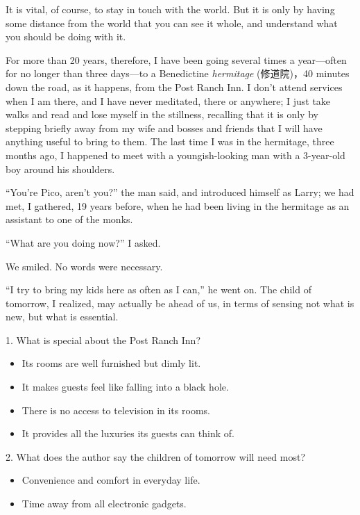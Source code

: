 \documentclass[UTF8,11pt]{ctexart}
\begin{document}
It is vital, of course, to stay in touch with the world. But it is only by having some distance from the world that you can see it whole, and understand what you should be doing with it.


For more than 20 years, therefore, I have been going several times a year—often for no longer than three days—to a Benedictine\textit{ hermitage} (修道院)，40 minutes down the road, as it happens, from the Post Ranch Inn. I don’t attend services when I am there, and I have never meditated, there or anywhere; I just take walks and read and lose myself in the stillness, recalling that it is only by stepping briefly away from my wife and bosses and friends that I will have anything useful to bring to them. The last time I was in the hermitage, three months ago, I happened to meet with a youngish-looking man with a 3-year-old boy around his shoulders.


“You’re Pico, aren’t you?” the man said, and introduced himself as Larry; we had met, I gathered, 19 years before, when he had been living in the hermitage as an assistant to one of the monks.


“What are you doing now?” I asked.


We smiled. No words were necessary.


“I try to bring my kids here as often as I can,” he went on. The child of tomorrow, I realized, may actually be ahead of us, in terms of sensing not what is new, but what is essential.


1. What is special about the Post Ranch Inn?


\begin{itemize}[leftmargin=2em,itemsep=.2em,topsep=.4em]\item[A.] Its rooms are well furnished but dimly lit.
\item[B.] It makes guests feel like falling into a black hole.
\item[C.] There is no access to television in its rooms.
\item[D.] It provides all the luxuries its guests can think of.
\end{itemize}

2. What does the author say the children of tomorrow will need most?


\begin{itemize}[leftmargin=2em,itemsep=.2em,topsep=.4em]\item[A.] Convenience and comfort in everyday life.
\item[B.] Time away from all electronic gadgets.
\end{itemize}
\end{document}
